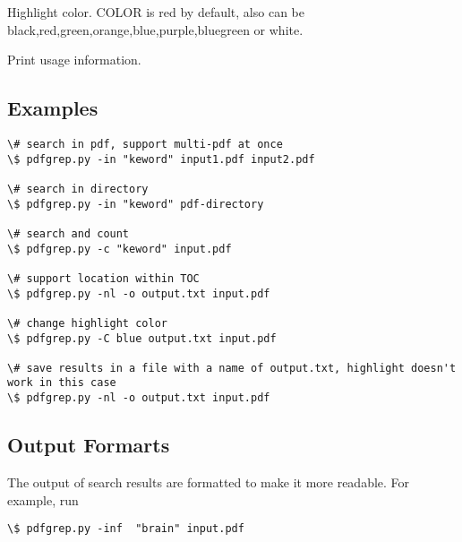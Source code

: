\documentclass[letterpaper,10pt,oneside]{sphinxmanual}
\begin{document}

\begin{fulllineitems}
\label{utility:cmdoption-pdfgrep.py-C}
Highlight color. COLOR is red by default, also can be black,red,green,orange,blue,purple,bluegreen or white.

\end{fulllineitems}


\begin{fulllineitems}
\label{utility:cmdoption-pdfgrep.py-h}
Print usage information.

\end{fulllineitems}



\subsection{Examples}
\label{utility:id2}
\begin{Verbatim}[commandchars=\\\{\}]
\# search in pdf, support multi-pdf at once
\$ pdfgrep.py -in "keword" input1.pdf input2.pdf

\# search in directory
\$ pdfgrep.py -in "keword" pdf-directory

\# search and count
\$ pdfgrep.py -c "keword" input.pdf

\# support location within TOC
\$ pdfgrep.py -nl -o output.txt input.pdf

\# change highlight color
\$ pdfgrep.py -C blue output.txt input.pdf

\# save results in a file with a name of output.txt, highlight doesn't work in this case
\$ pdfgrep.py -nl -o output.txt input.pdf
\end{Verbatim}


\subsection{Output Formarts}
\label{utility:output-formarts}
The output of search results are formatted to make it more readable. For example, run

\begin{Verbatim}[commandchars=\\\{\}]
\$ pdfgrep.py -inf  "brain" input.pdf
\end{Verbatim}
\end{document}
